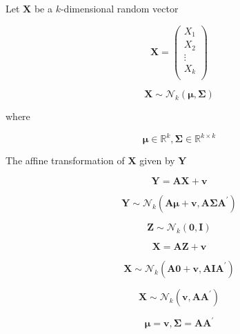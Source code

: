 Let $\boldsymbol{X}$ be a $k$-dimensional random vector

$$
\boldsymbol{X} = 
\left(
\begin{array}{c}
X_{1} \\
X_{2} \\
\vdots \\
X_{k} \\
\end{array}
\right)
$$

$$
\boldsymbol{X}
\sim 
\mathcal{N}_{k}
\left(
\boldsymbol{\mu},
\boldsymbol{\Sigma}
\right)
$$

where

$$
\boldsymbol{\mu} \in \mathbb{R}^{k},
\boldsymbol{\Sigma} \in \mathbb{R}^{k \times k}
$$

The affine transformation of $\boldsymbol{X}$ given by $\boldsymbol{Y}$

$$
\boldsymbol{Y}  =
\boldsymbol{A}
\boldsymbol{X}
+
\boldsymbol{v}
$$

$$
\boldsymbol{Y}
\sim 
\mathcal{N}_{k}
\left(
\boldsymbol{A}
\boldsymbol{\mu}
+
\boldsymbol{v},
\boldsymbol{A}
\boldsymbol{\Sigma}
\boldsymbol{A}^{\prime}
\right)
$$

$$
\boldsymbol{Z}
\sim 
\mathcal{N}_{k}
\left(
\boldsymbol{0},
\boldsymbol{I}
\right)
$$

$$
\boldsymbol{X}  =
\boldsymbol{A}
\boldsymbol{Z}
+
\boldsymbol{v}
$$

$$
\boldsymbol{X}
\sim 
\mathcal{N}_{k}
\left(
\boldsymbol{A}
\boldsymbol{0}
+
\boldsymbol{v},
\boldsymbol{A}
\boldsymbol{I}
\boldsymbol{A}^{\prime}
\right)
$$

$$
\boldsymbol{X}
\sim 
\mathcal{N}_{k}
\left(
\boldsymbol{v},
\boldsymbol{A}
\boldsymbol{A}^{\prime}
\right)
$$

$$
\boldsymbol{\mu} = 
\boldsymbol{v},
\boldsymbol{\Sigma} =
\boldsymbol{A}
\boldsymbol{A}^{\prime}
$$
